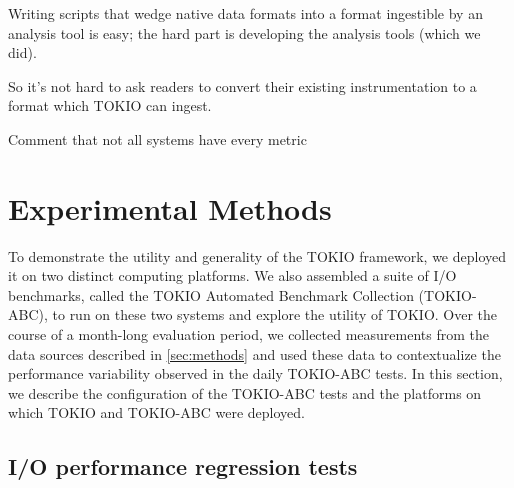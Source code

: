 Writing scripts that wedge native data formats into a format ingestible by an analysis tool is easy; the hard part is developing the analysis tools (which we did).

So it's not hard to ask readers to convert their existing instrumentation to a format which TOKIO can ingest.

Comment that not all systems have every metric

\section{Experimental Methods} \label{sec:platforms}

To demonstrate the utility and generality of the TOKIO framework, we deployed it on two distinct computing platforms.
We also assembled a suite of I/O benchmarks, called the TOKIO Automated Benchmark Collection (TOKIO-ABC), to run on these two systems and explore the utility of TOKIO.  
Over the course of a month-long evaluation period, we collected measurements from the data sources described in \ref{sec:methods} and used these data to contextualize the performance variability observed in the daily TOKIO-ABC tests.
In this section, we describe the configuration of the TOKIO-ABC tests and the platforms on which TOKIO and TOKIO-ABC were deployed.

\subsection{I/O performance regression tests} \label{sec:methods/tests}

